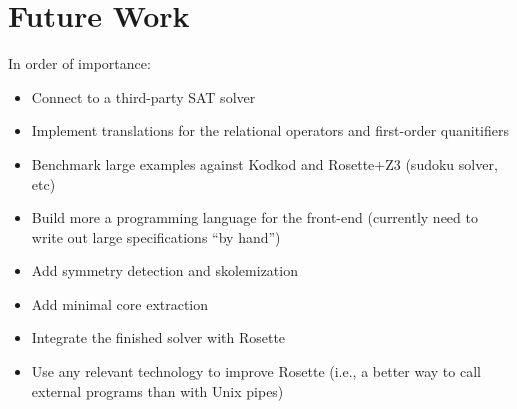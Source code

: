 \section{Future Work}
\label{sec:future}

In order of importance:
\begin{itemize}
\item Connect to a third-party SAT solver
\item Implement translations for the relational operators and first-order quanitifiers
\item Benchmark large examples against Kodkod and Rosette+Z3 (sudoku solver, etc)
\item Build more a programming language for the front-end (currently need to write out large specifications ``by hand'')
\item Add symmetry detection and skolemization
\item Add minimal core extraction
\item Integrate the finished solver with Rosette
\item Use any relevant technology to improve Rosette (i.e., a better way to call external programs than with Unix pipes)
\end{itemize}
